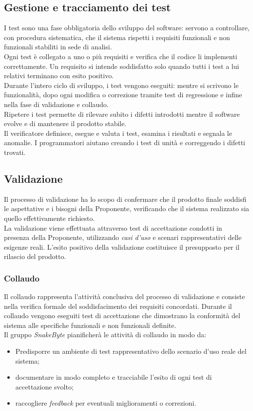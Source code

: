 \documentclass[10pt, letterpaper]{article}
\begin{document}
\subsection{Gestione e tracciamento dei test}
I test sono una fase obbligatoria dello sviluppo del software: servono a controllare, con procedura sistematica, che il sistema rispetti i requisiti funzionali e non funzionali stabiliti in sede di analisi.\\
Ogni test è collegato a uno o più requisiti e verifica che il codice li implementi correttamente. Un requisito si intende soddisfatto solo quando tutti i test a lui relativi terminano con esito positivo.\\
Durante l'intero ciclo di sviluppo, i test vengono eseguiti: mentre si scrivono le funzionalità, dopo ogni modifica o correzione tramite test di regressione e infine nella fase di validazione e collaudo.\\
Ripetere i test permette di rilevare subito i difetti introdotti mentre il software evolve e di mantenere il prodotto stabile. \\
Il verificatore definisce, esegue e valuta i test, esamina i risultati e segnala le anomalie. I programmatori aiutano creando i test di unità e correggendo i difetti trovati.

\subsection{Validazione}
Il processo di validazione ha lo scopo di confermare che il prodotto finale
soddisfi le aspettative e i bisogni della Proponente, verificando che il sistema
realizzato sia quello effettivamente richiesto.
\\La validazione viene effettuata attraverso test di accettazione condotti in
presenza della Proponente, utilizzando \textit{casi d'uso} e scenari
rappresentativi delle esigenze reali. L'esito positivo della validazione
costituisce il presupposto per il rilascio del prodotto.

\subsubsection{Collaudo}
Il collaudo rappresenta l'attività conclusiva del processo di validazione e
consiste nella verifica formale del soddisfacimento dei requisiti concordati.
Durante il collaudo vengono eseguiti test di accettazione
che dimostrano la conformità del sistema alle specifiche funzionali e non
funzionali definite.
\\Il gruppo \textit{SnakeByte} pianificherà le attività di collaudo in modo da:
\begin{itemize}
    \item Predisporre un ambiente di test rappresentativo dello scenario d'uso
          reale del sistema;
    \item documentare in modo completo e tracciabile l'esito di ogni test di
          accettazione svolto;
    \item raccogliere \textit{feedback} per eventuali
          miglioramenti o correzioni.
\end{itemize}
\end{document}
